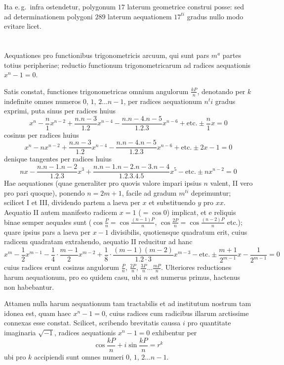 \documentclass[12pt,a4paper]{article}
\theoremstyle{plain}
\theoremstyle{definition}
\theoremstyle{remark}
\begin{document}
Ita e.\,g.\ infra ostendetur, polygonum $17$ laterum geometrice construi posse: sed ad determinationem polygoni $289$ laterum aequationem $17^{ti}$ gradus nullo modo evitare licet.

\section{}

Aequationes pro functionibus trigonometricis arcuum, qui sunt pars $m^a$ partes totius peripheriae; reductio functionum trigonometricarum ad radices aequationis $x^n-1=0$.

Satis constat, functiones trigonometricas omnium angulorum $\frac{kP}{n}$, denotando per $k$ indefinite omnes numeros $0$, $1$, $2\ldots n-1$, per radices aequationum $n^ti$ gradus exprimi, puta sinus per radices huius
\begin{equation}
x^n-\frac{n}{1}x^{n-2}+\frac{n.n-3}{1.2}x^{n-4}-\frac{n.n-4.n-5}{1.2.3}x^{n-6}+\text{etc.}\pm\frac{n}{1}x=0\tag{I}
\end{equation}
cosinus per radices huius
\begin{equation}
x^n-nx^{n-2}+\frac{n.n-3}{1.2}x^{n-4}-\frac{n.n-4.n-5}{1.2.3}x^{n-6}+\text{etc.}\pm 2x-1=0\tag{II}
\end{equation}
denique tangentes per radices huius
\begin{equation}
nx-\frac{n.n-1.n-2}{1.2.3}x^3+\frac{n.n-1.n-2.n-3.n-4}{1.2.3.4.5}x^5-\text{etc.}\pm nx^{n-2}=0\tag{III}
\end{equation}
Hae aequationes (quae generaliter pro quovis valore impari ipsius $n$ valent, II vero pro pari quoque), ponendo $n=2m+1$, facile ad gradum $m^{ti}$ deprimuntur; scilicet I et III, dividendo partem a laeva per $x$ et substituendo $y$ pro $xx$. Aequatio II autem manifesto radicem $x=1$ ($=\cos 0$) implicat, et e reliquis binae semper aequales sunt ($\cos\frac{P}{n}=\cos\frac{(n-1)P}{n}$, $\cos\frac{2P}{n}=\cos\frac{(n-2)P}{n}$ etc.); quare ipsius pars a laeva per $x-1$ divisibilis, quotiensque quadratum erit, cuius radicem quadratam extrahendo, aequatio II reducitur ad hanc
\[x^m-\frac{1}{2}x^{m-1}-\frac{1}{4}\cdot\frac{m-1}{2}x^{m-2}+\frac{1}{8}\cdot\frac{(m-1)(m-2)}{1.2\cdot 3}x^{m-3}-\text{etc.}\pm\frac{m+1}{2^{m-1}}x-\frac{1}{2^{m-1}}=0\]
cuius radices erunt cosinus angulorum $\frac{P}{n}$, $\frac{2P}{n}$, $\frac{3P}{n}\ldots\frac{mP}{n}$. Ulteriores reductiones harum aequationum, pro eo quidem casu, ubi $n$ est numerus primus, hactenus non habebantur.

Attamen nulla harum aequationum tam tractabilis et ad institutum nostrum tam idonea est, quam haec $x^n-1=0$, cuius radices cum radicibus illarum arctissime connexas esse constat. Scilicet, scribendo brevitatis caussa $i$ pro quantitate imaginaria $\surd{-1}$, radices aequationis $x^n-1=0$ exhibentur per
\[\cos\frac{kP}{n}+i\sin\frac{kP}{n}=r^k\]
ubi pro $k$ accipiendi sunt omnes numeri $0$, $1$, $2\ldots n-1$.
\end{document}
